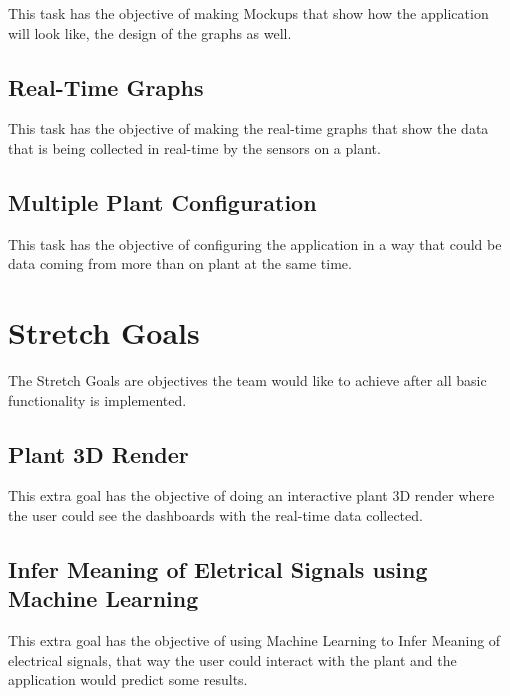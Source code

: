 \documentclass[a4paper, 11pt]{report}
\begin{document}
This task has the objective of making Mockups that show how the application will look like, the design of the graphs as well.

\subsection{Real-Time Graphs}

This task has the objective of making the real-time graphs that show the data that is being collected in real-time by the sensors on a plant.

\subsection{Multiple Plant Configuration}

This task has the objective of configuring the application in a way that could be data coming from more than on plant at the same time.

\section{Stretch Goals}

The Stretch Goals are objectives the team would like to achieve after all basic functionality is implemented.

\subsection{Plant 3D Render}

This extra goal has the objective of doing an interactive plant 3D render where the user could see the dashboards with the real-time data collected.

\subsection{Infer Meaning of Eletrical Signals using Machine Learning}

This extra goal has the objective of using Machine Learning to Infer Meaning of electrical signals, that way the user could interact with the plant and the application would predict some results.
\end{document}
